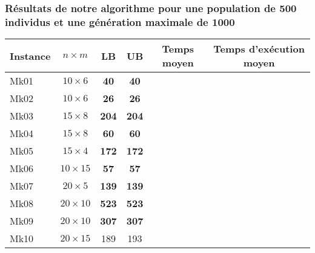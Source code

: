 \subsubsection{Résultats de notre algorithme pour une population de 500 individus et une génération maximale de 1000}

\begin{table}[!h]
    \renewcommand{\arraystretch}{1.5}
    \centering
    \begin{tabular}{p{} c c c c c}
        Instance & $n \times m$ & LB & UB & Temps moyen & Temps d'exécution moyen \\
         \hline
        Mk01 & $10 \times 6$ & \textbf{40} & \textbf{40} & & \\
         \hline
        Mk02 & $10 \times 6$ & \textbf{26} & \textbf{26} & & \\
         \hline
        Mk03 & $15 \times 8$ & \textbf{204} & \textbf{204} & & \\
         \hline
        Mk04 & $15 \times 8$ & \textbf{60} & \textbf{60} & & \\
         \hline
        Mk05 & $15 \times 4$ & \textbf{172} & \textbf{172} & & \\
         \hline
        Mk06 & $10 \times 15$ & \textbf{57} & \textbf{57} & & \\
         \hline
        Mk07 & $20 \times 5$ & \textbf{139} & \textbf{139} & & \\
         \hline
        Mk08 & $20 \times 10$ & \textbf{523} & \textbf{523} & & \\
         \hline
        Mk09 & $20 \times 10$ & \textbf{307} & \textbf{307} & & \\
         \hline
        Mk10 & $20 \times 15$ & 189 & 193 \\
         \hline 
    \end{tabular}
\end{table}